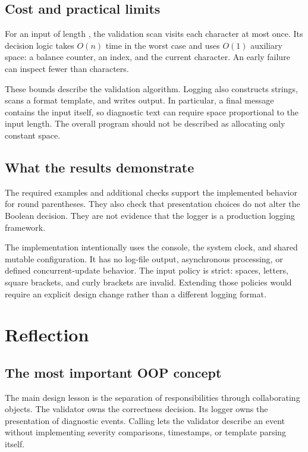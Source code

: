 \subsection{Cost and practical limits}
For an input of length , the validation scan visits each character at most once. Its decision logic takes \(O(n)\) time in the worst case and uses \(O(1)\) auxiliary space: a balance counter, an index, and the current character. An early failure can inspect fewer than  characters.

These bounds describe the validation algorithm. Logging also constructs strings, scans a format template, and writes output. In particular, a final message contains the input itself, so diagnostic text can require space proportional to the input length. The overall program should not be described as allocating only constant space.

\subsection{What the results demonstrate}
The required examples and additional checks support the implemented behavior for round parentheses. They also check that presentation choices do not alter the Boolean decision. They are not evidence that the logger is a production logging framework.

The implementation intentionally uses the console, the system clock, and shared mutable configuration. It has no log-file output, asynchronous processing, or defined concurrent-update behavior. The input policy is strict: spaces, letters, square brackets, and curly brackets are invalid. Extending those policies would require an explicit design change rather than a different logging format.

\newpage
\section{Reflection}
\subsection{The most important OOP concept}
The main design lesson is the separation of responsibilities through collaborating objects. The validator owns the correctness decision. Its logger owns the presentation of diagnostic events. Calling  lets the validator describe an event without implementing severity comparisons, timestamps, or template parsing itself.

